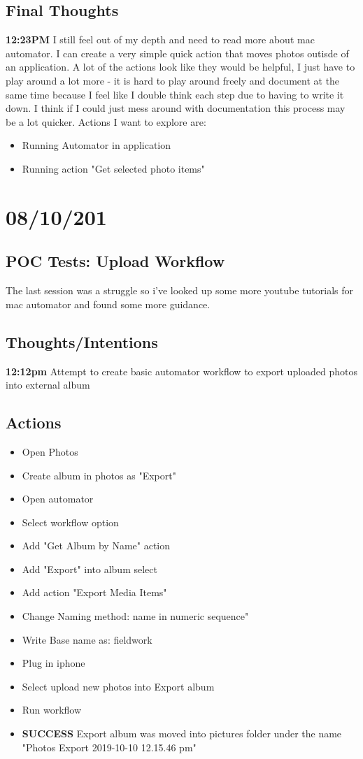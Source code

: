 \documentclass{article}
\begin{document}
\subsection{Final Thoughts}
\textbf{12:23PM} I still feel out of my depth and need to read more about mac automator. I can create a very simple quick action that moves photos outisde of an application. A lot of the actions look like they would be helpful, I just have to play around a lot more - it is hard to play around freely and document at the same time because I feel like I double think each step due to having to write it down. I think if I could just mess  around with  documentation this process may be a lot quicker. Actions I want to explore are:
\begin{itemize}
\item Running Automator in application
\item Running action "Get selected photo items"
\end{itemize}

\section{08/10/201}
\subsection{POC Tests: Upload Workflow}
The last session was a struggle so i've looked up some more youtube tutorials for mac automator and found some more guidance. 
\subsection{Thoughts/Intentions}
\textbf{12:12pm} Attempt to create basic automator workflow to export uploaded photos into external album

\subsection{Actions}
\begin{itemize}
\item Open Photos
\item Create album in photos as "Export"
\item Open automator
\item Select workflow option
\item Add "Get Album by Name" action
\item Add "Export" into album select
\item Add action "Export Media Items"
\item Change Naming method: name in numeric sequence"
\item Write Base name as: fieldwork
\item Plug in iphone
\item Select upload new photos into Export album
\item Run workflow 
\item \textbf{SUCCESS} Export album was moved into pictures folder under the name "Photos Export 2019-10-10 12.15.46 pm"
\end{itemize}
\end{document}
